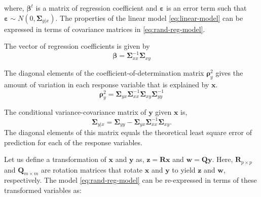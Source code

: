 \documentclass[3p,times,12pt,authoryear]{elsarticle}
\providecommand{\tightlist}{%
  \setlength{\itemsep}{0pt}\setlength{\parskip}{0pt}}
\theoremstyle{definition}
\theoremstyle{definition}
\theoremstyle{remark}
\begin{document}
where, \(\boldsymbol{\beta}^t\) is a matrix of regression coefficient
and \(\boldsymbol{\varepsilon}\) is an error term such that
\(\boldsymbol{\varepsilon} \sim N\left(0, \boldsymbol{\Sigma}_{y|x}\right)\).
The properties of the linear model \eqref{eq:linear-model} can be
expressed in terms of covariance matrices in \eqref{eq:rand-reg-model}.

\begin{description}
\tightlist
\item[Regression Coefficients]
The vector of regression coefficients is given by
\[ \boldsymbol{\beta} = \boldsymbol{\Sigma}_{xx}^{-1}\boldsymbol{\Sigma}_{xy}\]
\item[Coefficient of Determination]
The diagonal elements of the coefficient-of-determination matrix
\(\boldsymbol{\rho}_y^2\) gives the amount of variation in each response
variable that is explained by \(\mathbf{x}\).
\[\boldsymbol{\rho}_y^2 = \boldsymbol{\Sigma}_{yx}\boldsymbol{\Sigma}_{xx}^{-1}\boldsymbol{\Sigma}_{xy}\boldsymbol{\Sigma}_{yy}^{-1}\]
\item[Conditional variance]
The conditional variance-covariance matrix of \(\mathbf{y}\) given
\(\mathbf{x}\) is,
\[\boldsymbol{\Sigma}_{y|x} = \boldsymbol{\Sigma}_{yy} - \boldsymbol{\Sigma}_{yx}\boldsymbol{\Sigma}_{xx}^{-1}\boldsymbol{\Sigma}_{xy}.\]
The diagonal elements of this matrix equals the theoretical least square
error of prediction for each of the response variables.
\end{description}

Let us define a transformation of \(\mathbf{x}\) and \(\mathbf{y}\) as,
\(\mathbf{z} = \mathbf{Rx}\) and \(\mathbf{w} = \mathbf{Qy}\). Here,
\(\mathbf{R}_{p\times p}\) and \(\mathbf{Q}_{m\times m}\) are rotation
matrices that rotate \(\mathbf{x}\) and \(\mathbf{y}\) to yield
\(\mathbf{z}\) and \(\mathbf{w}\), respectively. The model
\eqref{eq:rand-reg-model} can be re-expressed in terms of these
transformed variables as:
\end{document}
